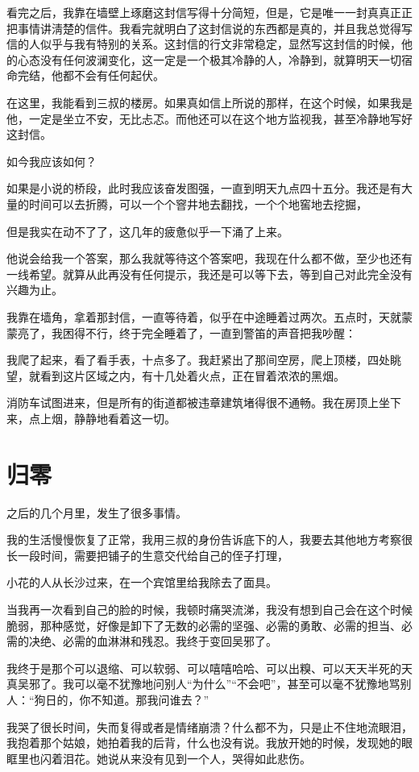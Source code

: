 看完之后，我靠在墙壁上琢磨这封信写得十分简短，但是，它是唯一一封真真正正把事情讲淸楚的信件。我看完就明白了这封信说的东西都是真的，并且我总觉得写信的人似乎与我有特别的关系。这封信的行文非常稳定，显然写这封信的时候，他的心态没有任何波澜变化，这一定是一个极其冷静的人，冷静到，就算明天一切宿命完结，他都不会有任何起伏。

在这里，我能看到三叔的楼房。如果真如信上所说的那样，在这个时候，如果我是他，一定是坐立不安，无比忐忑。而他还可以在这个地方监视我，甚至冷静地写好这封信。

如今我应该如何？

如果是小说的桥段，此时我应该奋发图强，一直到明天九点四十五分。我还是有大量的时间可以去折腾，可以一个个窨井地去翻找，一个个地窖地去挖掘，

但是我实在动不了了，这几年的疲惫似乎一下涌了上来。

他说会给我一个答案，那么我就等待这个答案吧，我现在什么都不做，至少也还有一线希望。就算从此再没有任何提示，我还是可以等下去，等到自己对此完全没有兴趣为止。

我靠在墙角，拿着那封信，一直等待着，似乎在中途睡着过两次。五点时，天就蒙蒙亮了，我困得不行，终于完全睡着了，一直到警笛的声音把我吵醒：

我爬了起来，看了看手表，十点多了。我赶紧出了那间空房，爬上顶楼，四处眺望，就看到这片区域之内，有十几处着火点，正在冒着浓浓的黑烟。

消防车试图进来，但是所有的街道都被违章建筑堵得很不通畅。我在房顶上坐下来，点上烟，静静地看着这一切。

\chapter{归零}

之后的几个月里，发生了很多事情。

我的生活慢慢恢复了正常，我用三叔的身份告诉底下的人，我要去其他地方考察很长一段时间，需要把铺子的生意交代给自己的侄子打理，

小花的人从长沙过来，在一个宾馆里给我除去了面具。

当我再一次看到自己的脸的时候，我顿时痛哭流涕，我没有想到自己会在这个时候脆弱，那种感觉，好像是卸下了无数的必需的坚强、必需的勇敢、必需的担当、必需的决绝、必需的血淋淋和残忍。我终于变回吴邪了。

我终于是那个可以退缩、可以软弱、可以嘻嘻哈哈、可以出糗、可以天天半死的天真吴邪了。我可以毫不犹豫地问别人“为什么”“不会吧”，甚至可以毫不犹豫地骂别人：“狗日的，你不知道。那我问谁去？”

我哭了很长时间，失而复得或者是情绪崩溃？什么都不为，只是止不住地流眼泪，我抱着那个姑娘，她拍着我的后背，什么也没有说。我放开她的时候，发现她的眼眶里也闪着泪花。她说从来没有见到一个人，哭得如此悲伤。

